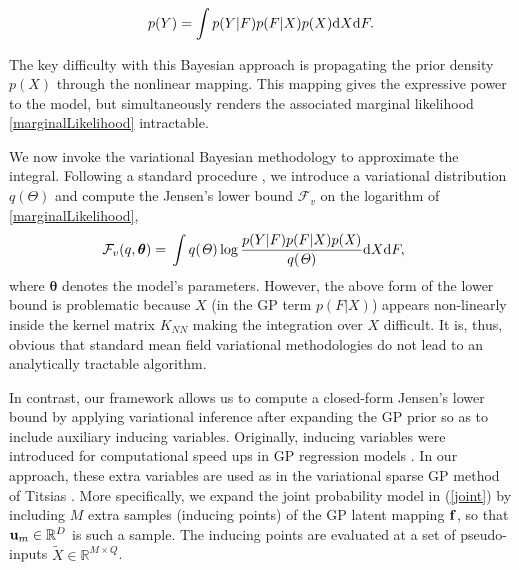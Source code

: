 \documentclass [10pt , a4paper]{article}
\begin{document}
\begin{equation}
\label{marginalLikelihood}
p(Y) =  \int p( Y | F) p(F | X ) p(X) \text{d}  X \text{d} F .
\end{equation}
 
\noindent The key difficulty with this Bayesian approach is propagating the prior
density $p(X)$ through the nonlinear mapping. This
mapping gives the expressive power to the model, but simultaneously
renders the associated marginal likelihood \eqref{marginalLikelihood} intractable. 

\par We now invoke the variational Bayesian methodology to
approximate the integral. Following a standard procedure
\cite{bishop}, we introduce a variational distribution $q(\Theta)$ and
compute the Jensen's lower bound $\mathcal{F}_v$ on the logarithm of
\eqref{marginalLikelihood},
%
\begin{align}
\mathcal{F}_v(q, \boldsymbol \theta) = {}& \int q(\mathit{\Theta}) \log 
		\frac{ p(Y | F) p(F | X ) p(\mathit{X})}
			 {q(\mathit{\Theta})}  \text{d}  X \text{d} F,
		 \label{jensens1}
\end{align}
%
%
where $\boldsymbol \theta$ denotes the model's parameters.  However,
the above form of the lower bound is problematic because $X$ (in the
GP term $p(F|X)$) appears non-linearly inside the kernel matrix
$K_{NN}$ making the integration over $X$ difficult.
It is, thus, obvious that standard mean field variational methodologies do not lead to an analytically
tractable algorithm.
\par In contrast, our framework allows us to compute
a closed-form Jensen's lower bound
by applying variational inference after expanding the GP prior so as to include auxiliary inducing
variables. Originally, inducing variables were introduced for computational speed ups in GP regression models
\cite{Csato:sparse02,Seeger:fast03,Csato:thesis02,Snelson:pseudo05,Quinonero:unifying05,Titsias:variational09}.
 In our approach, these extra variables are used as in the variational sparse GP method of Titsias
\cite{Titsias:variational09}.
More specifically, we expand the joint
 probability model in (\ref{joint}) by including $M$ extra samples (inducing points) of
 the GP latent mapping $\mathbf{f}$, so that
 $\mathbf{u}_m \in \mathbb{R}^D$ is such a sample. The inducing points are
 evaluated at a set of pseudo-inputs $\tilde{X} \in \mathbb{R}^{M
   \times Q}$.
\end{document}
